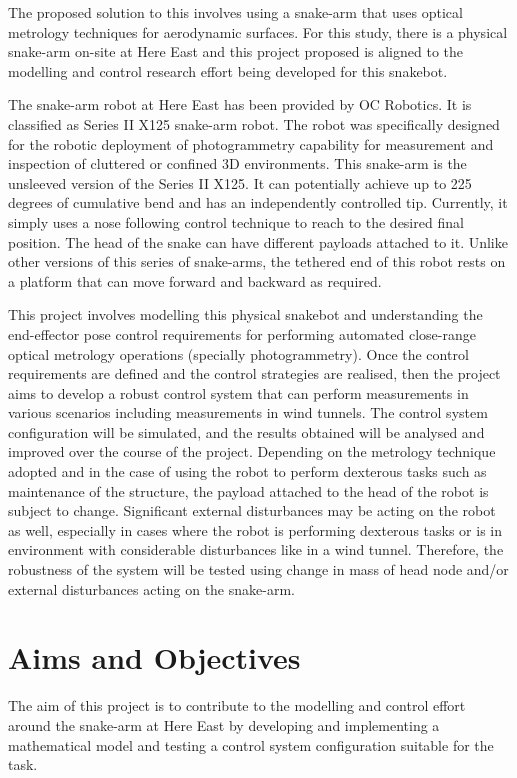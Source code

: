 \documentclass[a4paper,12pt]{report}
\begin{document}
The proposed solution to this involves using a snake-arm that uses optical metrology techniques for aerodynamic surfaces. For this study, there is a physical snake-arm on-site at Here East and this project proposed is aligned to the modelling and control research effort being developed for this snakebot.

The snake-arm robot at Here East has been provided by OC Robotics. It is classified as Series II X125 snake-arm robot. The robot was specifically designed for the robotic deployment of photogrammetry capability for measurement and inspection of cluttered or confined 3D environments. This snake-arm is the unsleeved version of the Series II X125. It can potentially achieve up to 225 degrees of cumulative bend \cite{OCRobotics_Series_II_Webpage} and has an independently controlled tip. Currently, it simply uses a nose following control technique to reach to the desired final position.  The head of the snake can have different payloads attached to it. Unlike other versions of this series of snake-arms, the tethered end of this robot rests on a platform that can move forward and backward as required.

This project involves modelling this physical snakebot and understanding the end-effector pose control requirements for performing automated close-range optical metrology operations (specially photogrammetry). Once the control requirements are defined and the control strategies are realised, then the project aims to develop a robust control system that can perform measurements in various scenarios including measurements in wind tunnels. The control system configuration will be simulated, and the results obtained will be analysed and improved over the course of the project. Depending on the metrology technique adopted and in the case of using the robot to perform dexterous tasks such as maintenance of the structure, the payload attached to the head of the robot is subject to change. Significant external disturbances may be acting on the robot as well, especially in cases where the robot is performing dexterous tasks or is in environment with considerable disturbances like in a wind tunnel. Therefore, the robustness of the system will be tested using change in mass of head node and/or external disturbances acting on the snake-arm.

\section{Aims and Objectives}
\label{objectives}
The aim of this project is to contribute to the modelling and control effort around the snake-arm at Here East by developing and implementing a mathematical model and testing a control system configuration suitable for the task.
\end{document}
